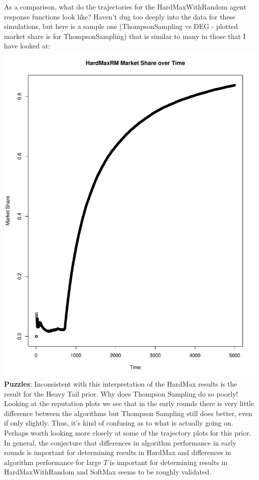 \documentclass[11pt,letterpaper]{article}
\begin{document}
As a comparison, what do the trajectories for the HardMaxWithRandom agent response functions look like? Haven't dug too deeply into the data for these simulations, but here is a sample one (ThompsonSampling vs DEG - plotted market share is for ThompsonSampling) that is similar to many in those that I have looked at: \\
\includegraphics[scale=0.25]{hmr_over_time} \\
\textbf{Puzzles}: Inconsistent with this interpretation of the HardMax results is the result for the Heavy Tail prior. Why does Thompson Sampling do so poorly! Looking at the reputation plots we see that in the early rounds there is very little difference between the algorithms but Thompson Sampling still does better, even if only slightly. Thus, it's kind of confusing as to what is actually going on. Perhaps worth looking more closely at some of the trajectory plots for this prior.\\

In general, the conjecture that differences in algorithm performance in early rounds is important for determining results in HardMax and differences in algorithm performance for large $T$ is important for determining results in HardMaxWithRandom and SoftMax seems to be roughly validated.
\end{document}

